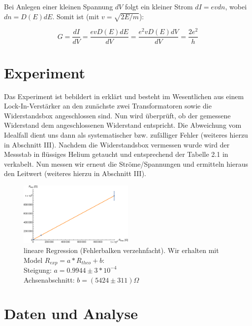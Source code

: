 \documentclass[aps,twocolumn,secnumarabic,nobalancelastpage,amsmath,amssymb,
nofootinbib,superscriptaddress]{revtex4-1}
\begin{document}
Bei Anlegen einer kleinen Spannung $dV$ folgt ein kleiner Strom $dI = e v dn$,
wobei $dn = D(E)dE$. Somit ist (mit $v = \sqrt{2E/m}$):

  \begin{equation}
    G = \frac{dI}{dV} = \frac{evD(E)dE}{dV} = \frac{e^2vD(E)dV}{dV} = \frac{2e^2}{h}
  \end{equation}






\section{Experiment}

Das Experiment ist bebildert in \cite{skript11} erklärt und besteht im Wesentlichen
aus einem Lock-In-Verstärker an den zunächste zwei Transformatoren sowie die
Widerstandsbox angeschlossen sind. Nun wird überprüft, ob der gemessene Widerstand
dem angeschlossenen Widerstand entspricht. Die Abweichung vom Idealfall dient uns
dann als systematischer bzw. zufälliger Fehler (weiteres hierzu in Abschnitt III).
Nachdem die Widerstandsbox vermessen wurde wird der Messstab in flüssiges Helium
getaucht und entsprechend der Tabelle 2.1 in \cite{skript11} verkabelt. Nun messen
wir erneut die Ströme/Spannungen und ermitteln hieraus den Leitwert (weiteres
hierzu in Abschnitt III).

\begin{figure}[h]
  \centering
  \includegraphics[width=0.5\textwidth]{Berechnung-Bilder/box.eps}
  \caption{
  lineare Regression (Fehlerbalken verzehnfacht). Wir erhalten mit
  Model $R_{exp}=a*R_{theo}+b$:\\
  Steigung:  $a = 0.9944 \pm 3*10^{-4}$\\
  Achsenabschnitt:  $b = (5424 \pm 311) \Omega$
  }
  \label{fig:box}
\end{figure}



\section{Daten und Analyse}
\end{document}
